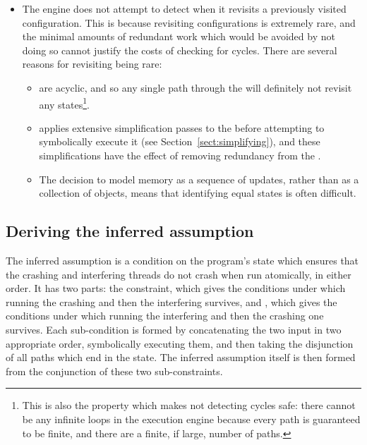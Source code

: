\begin{itemize}

\item {} The engine
  does not attempt to detect when it revisits a previously visited
  configuration.  This is because revisiting configurations is
  extremely rare, and the minimal amounts of redundant work which
  would be avoided by not doing so cannot justify the costs of
  checking for cycles.  There are several reasons for revisiting being
  rare:

  \begin{itemize}
  \item {\STateMachines} are acyclic, and so any single path through
    the {\StateMachine} will definitely not revisit any
    states\footnote{This is also the property which makes not
      detecting cycles safe: there cannot be any infinite loops in the
      execution engine because every path is guaranteed to be finite,
      and there are a finite, if large, number of paths.}.
  \item {\Technique} applies extensive simplification passes to the
    {\StateMachine} before attempting to symbolically execute it (see
    Section~\ref{sect:simplifying}), and these simplifications have
    the effect of removing redundancy from the {\StateMachines}.
  \item The decision to model memory as a sequence of updates, rather
    than as a collection of objects, means that identifying equal
    states is often difficult.  
  \end{itemize}
\end{itemize}

\subsection{Deriving the inferred assumption}

\label{sect:derive:inferred_assumption}

The inferred assumption is a condition on the program's state which
ensures that the crashing and interfering threads do not crash when
run atomically, in either order.  It has two parts: the
 constraint, which gives the conditions under
which running the crashing {\StateMachine} and then the interfering
{\StateMachine} survives, and , which gives the conditions under
which running the interfering {\StateMachine} and then the crashing
one survives.  Each sub-condition is formed by concatenating the two
input {\StateMachines} in two appropriate order, symbolically
executing them, and then taking the disjunction of all paths which end
in the {\stSurvive} state.  The inferred assumption itself is then formed
from the conjunction of these two sub-constraints.

